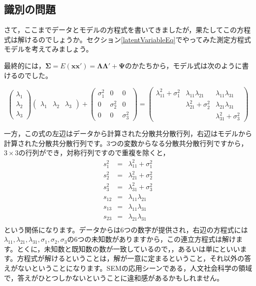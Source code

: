 \documentclass{ltjsbook}
\begin{document}
\subsection{識別の問題}
さて，ここまでデータとモデルの方程式を書いてきましたが，果たしてこの方程式は解けるのでしょうか。セクション\ref{latentVariableEq}でやってみた測定方程式モデルを考えてみましょう。

最終的には，$\bm{\Sigma} = E(\bm{xx}' )= \bm{\Lambda \Lambda}' + \bm{\Psi} $のかたちから，モデル式は次のように書けるのでした。

\[
	\begin{pmatrix} \lambda_1\\ \lambda_2 \\ \lambda_3 \end{pmatrix}\begin{pmatrix} \lambda_1 & \lambda_2 & \lambda_3 \end{pmatrix} + \begin{pmatrix} \sigma_1^2 & 0& 0\\ 0& \sigma_2^2 & 0\\0 &0 & \sigma_3^2 \end{pmatrix}
	=
	\begin{pmatrix} \lambda_{11}^2 + \sigma_1^2 & \lambda_{11}\lambda_{21}    & \lambda_{11} \lambda_{31}   \\
                                            & \lambda_{21}^2 + \sigma_2^2 & \lambda_{21} \lambda_{31}   \\
                                            &                             & \lambda_{31}^2 + \sigma_3^2\end{pmatrix}
\]

一方，この式の左辺はデータから計算された分散共分散行列，右辺はモデルから計算された分散共分散行列です。3つの変数からなる分散共分散行列ですから，$3\times 3$の行列ができ，対称行列ですので重複を除くと，
\[
	\begin{array}{lll}
		s_1^2  & = & \lambda_{11}^2 + \sigma_1^2 \\
		s_2^2  & = & \lambda_{21}^2 + \sigma_2^2 \\
		s_3^2  & = & \lambda_{31}^2 + \sigma_3^2 \\
		s_{12} & = & \lambda_{11}\lambda_{21}    \\
		s_{13} & = & \lambda_{11}\lambda_{31}    \\
		s_{23} & = & \lambda_{21}\lambda_{31}    \\
	\end{array}
\]
という関係になります。データからは6つの数字が提供され，右辺の方程式には$\lambda_{11},\lambda_{21},\lambda_{31},\sigma_1,\sigma_2,\sigma_3$の6つの未知数がありますから，この連立方程式は解けます。とくに，未知数と既知数の数が一致しているので，，あるいは単にといいます。方程式が解けるということは，解が一意に定まるということ，それ以外の答えがないということになります。SEMの応用シーンである，人文社会科学の領域で，答えがひとつしかないということに違和感があるかもしれません。
\end{document}
